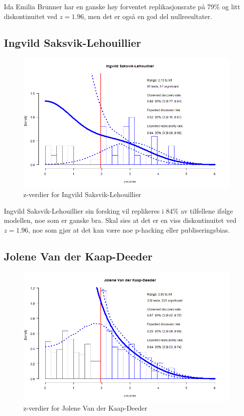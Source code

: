 \documentclass[doc,norsk]{apa7}
\begin{document}
Ida Emilia Brunner har en ganske høy forventet replikasjonsrate på 79\% og litt diskontinuitet ved $z=1.96$, men det er også en god del nullresultater.

\subsection{Ingvild Saksvik-Lehouillier}
\begin{figure}[h!]
    \centering
    \includegraphics[width=\textwidth]{images/Ingvild Saksvik-Lehouillier.png}
    \caption{z-verdier for Ingvild Saksvik-Lehouillier}
\end{figure}

Ingvild Saksvik-Lehouillier sin forsking vil replikeres i 84\% av tilfellene ifølge modellen, noe som er ganske bra. Skal sies at det er en viss diskontinuitet ved $z=1.96$, noe som gjør at det kan være noe p-hacking eller publiseringsbias.

\subsection{Jolene Van der Kaap-Deeder}
\begin{figure}[h!]
    \centering
    \includegraphics[width=\textwidth]{images/Jolene Van der Kaap-Deeder.png}
    \caption{z-verdier for Jolene Van der Kaap-Deeder}
\end{figure}
\end{document}
